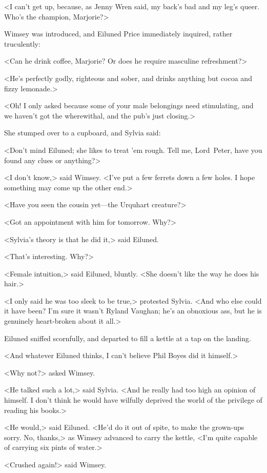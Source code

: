 <I can't get up, because, as Jenny Wren said, my back's bad and my leg's queer. Who's the champion, Marjorie?>

Wimsey was introduced, and Eiluned Price immediately inquired, rather truculently:

<Can he drink coffee, Marjorie? Or does he require masculine refreshment?>

<He's perfectly godly, righteous and sober, and drinks anything but cocoa and fizzy lemonade.>

<Oh! I only asked because some of your male belongings need stimulating, and we haven't got the wherewithal, and the pub's just closing.>

She stumped over to a cupboard, and Sylvia said:

<Don't mind Eiluned; she likes to treat 'em rough. Tell me, Lord~Peter, have you found any clues or anything?>

<I don't know,> said Wimsey. <I've put a few ferrets down a few holes. I hope something may come up the other end.>

<Have you seen the cousin yet—the Urquhart creature?>

<Got an appointment with him for tomorrow. Why?>

<Sylvia's theory is that he did it,> said Eiluned.

<That's interesting. Why?>

<Female intuition,> said Eiluned, bluntly. <She doesn't like the way he does his hair.>

<I only said he was too sleek to be true,> protested Sylvia. <And who else could it have been? I'm sure it wasn't Ryland Vaughan; he's an obnoxious ass, but he is genuinely heart-broken about it all.>

Eiluned sniffed scornfully, and departed to fill a kettle at a tap on the landing.

<And whatever Eiluned thinks, I can't believe Phil Boyes did it himself.>

<Why not?> asked Wimsey.

<He talked such a lot,> said Sylvia. <And he really had too high an opinion of himself. I don't think he would have wilfully deprived the world of the privilege of reading his books.>

<He would,> said Eiluned. <He'd do it out of spite, to make the grown-ups sorry. No, thanks,> as Wimsey advanced to carry the kettle, <I'm quite capable of carrying six pints of water.>

<Crushed again!> said Wimsey.

